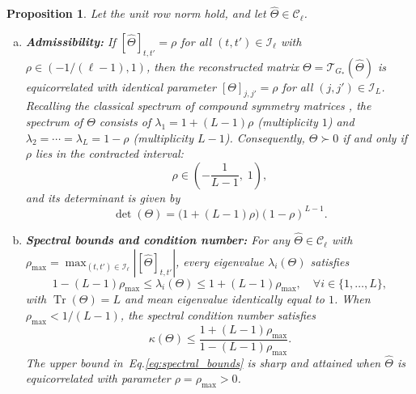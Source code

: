 \documentclass[default,sn-mathphys,Numbered]{sn-jnl}
\theoremstyle{thmstyleone}
\newtheorem{proposition}[theorem]{Proposition}
\theoremstyle{thmstylethree}
\theoremstyle{thmstyletwo}
\newcommand{\Tr}{\operatorname{Tr}}
\newcommand{\eqnref}[1]{\eqref{#1}}
\begin{document}
\begin{proposition}
\label{prop:spectral_bounds}
Let the unit row norm hold, and let $\hat{\Theta} \in \mathcal{C}_\ell$.
\begin{enumerate}[(a)]
    \item[(a)] \textbf{Admissibility:} If $[\hat{\Theta}]_{t, t'} = \rho$ for all $(t, t') \in \mathcal{I}_\ell$ with $\rho \in (-1/(\ell-1), 1)$, then the reconstructed matrix $\Theta = \mathcal{T}_{G_*}(\hat{\Theta})$ is equicorrelated with identical parameter $[\Theta]_{j, j'} = \rho$ for all $(j, j') \in \mathcal{I}_L$. Recalling the classical spectrum of compound symmetry matrices \citep{morrison1967multivariate,mardia1979multivariate,horn2012matrix}, the spectrum of $\Theta$ consists of $\lambda_1 = 1 + (L-1)\rho$ (multiplicity $1$) and $\lambda_2 = \cdots = \lambda_L = 1 - \rho$ (multiplicity $L-1$). Consequently, $\Theta \succ 0$ if and only if $\rho$ lies in the contracted interval:
    \begin{equation}
    \label{eq:equicorr_interval}
    \rho \in \left(-\frac{1}{L - 1},\; 1\right),
    \end{equation}
    and its determinant is given by
    \begin{equation}
    \label{eq:det_equicorr}
    \det(\Theta) = \bigl(1 + (L-1)\rho\bigr) (1 - \rho)^{L-1}.
    \end{equation}
    \item[(b)] \textbf{Spectral bounds and condition number:} For any $\hat{\Theta} \in \mathcal{C}_\ell$ with $\rho_{\max} = \max_{(t,t') \in \mathcal{I}_\ell} |[\hat{\Theta}]_{t, t'}|$, every eigenvalue $\lambda_i(\Theta)$ satisfies
    \begin{equation}
    \label{eq:spectral_bounds}
    1 - (L - 1)\rho_{\max} \le \lambda_i(\Theta) \le 1 + (L - 1)\rho_{\max}, \quad \forall i \in \{1, \ldots, L\},
    \end{equation}
    with $\Tr(\Theta) = L$ and mean eigenvalue identically equal to $1$. When $\rho_{\max} < 1/(L-1)$, the spectral condition number satisfies
    \begin{equation}
    \label{eq:cond_bound}
    \kappa(\Theta) \le \frac{1 + (L - 1)\rho_{\max}}{1 - (L - 1)\rho_{\max}}.
    \end{equation}
    The upper bound in~Eq.\eqnref{eq:spectral_bounds} is sharp and attained when $\hat{\Theta}$ is equicorrelated with parameter $\rho = \rho_{\max} > 0$.
\end{enumerate}
\end{proposition}
\end{document}
